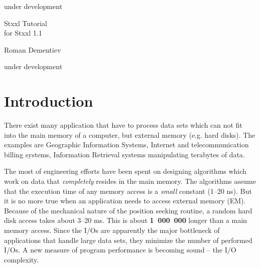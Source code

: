 \documentclass[twoside]{book}
\newcommand{\stxxl}{{\sc Stxxl} }
\begin{document}

%
\setcounter{page}{-2}%
\begin{titlepage}%
under development
\large
\vspace*{1cm}
\vspace*{1cm}
\vspace*{1cm}
\begin{center}
{\huge \stxxl Tutorial}\\

for \stxxl 1.1

\vspace{3mm}

{\LARGE Roman Dementiev\\[2mm]}

\vspace*{\fill}

{\normalsize under development}
\end{center}
\thispagestyle{empty}
\end{titlepage}


\thispagestyle{empty}


\setcounter{tocdepth}{1}
\tableofcontents
\clearpage
{}
\setcounter{page}{1}


\chapter{Introduction}

There exist many application that have to process data sets which
can not fit into the main memory of a computer, but external memory
(e.g. hard disks). The examples are Geographic Information
Systems, Internet and telecommunication billing
systems, Information Retrieval systems
manipulating terabytes of data. 

The most of engineering efforts have been spent on designing
algorithms which work on data that \emph{completely} resides in the main
memory. The algorithms assume that the execution time of any
memory access is a \emph{small} constant (1--20 ns). But it is no more
true when 
an application needs to access external memory (EM). Because of the
mechanical nature of the position seeking routine, a random hard disk
access takes about 3--20 ms. This 
is about {\bf 1~000~000} longer than a main memory access. Since the I/Os
are apparently the major bottleneck of applications that handle large
data sets, they minimize the number of performed I/Os.
A new measure of program performance is becoming sound -- the I/O
complexity. 
\end{document}
